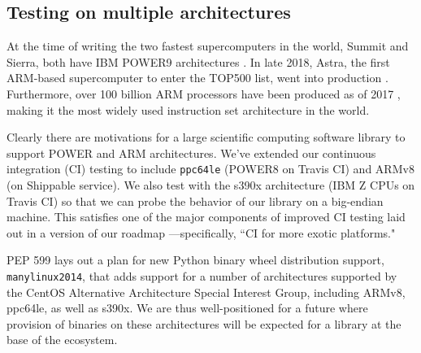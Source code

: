 \subsection*{Testing on multiple architectures}

At the time of writing the two fastest supercomputers in the
world, Summit and Sierra, both have IBM POWER9 architectures
\cite{top500nov2019}. In late 2018, Astra, the first ARM-based
supercomputer to enter the TOP500 list, went into production
\cite{astra-wiki}. Furthermore, over 100 billion ARM processors have been
produced as of 2017 \cite{arm-architecture}, making it the most 
widely used instruction set architecture in the world.

Clearly there are motivations for a large scientific computing
software library to support POWER and ARM architectures. We've extended
our continuous integration (CI) testing to include \texttt{ppc64le}
(POWER8 on Travis CI) and ARMv8 (on Shippable service). We also test
with the s390x architecture (IBM Z CPUs on Travis CI) so that we
can probe the behavior of our library on a big-endian machine.
This satisfies one of the major components of
improved CI testing laid out in a version of our roadmap
\cite{numpy-roadmap}---specifically, ``CI for more exotic
platforms."

PEP 599 \cite{PEP599} lays out a plan for new Python binary wheel
distribution support, \texttt{manylinux2014}, that adds
support for a number of architectures supported by the CentOS
Alternative Architecture Special Interest Group, including
ARMv8, ppc64le, as well as s390x. We are thus well-positioned
for a future where provision of binaries on these architectures
will be expected for a library at the base of the ecosystem.
